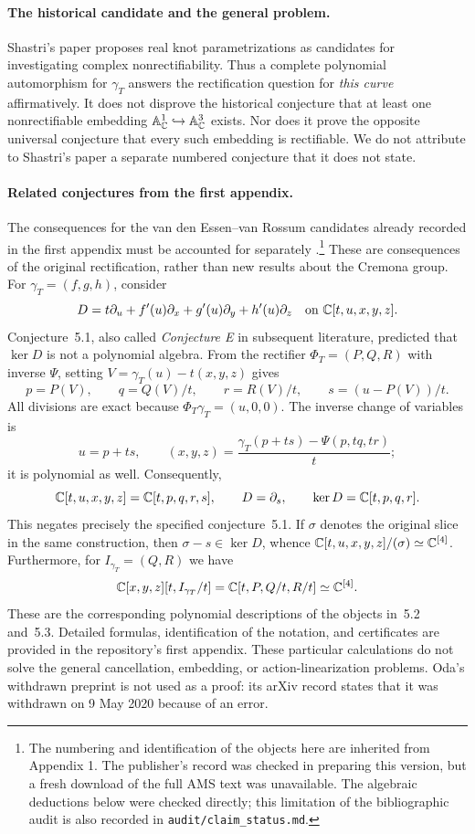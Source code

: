 \paragraph{The historical candidate and the general problem.}
Shastri's paper \cite[\S1 and \S3, Example~1]{Shastri1992} proposes
real knot parametrizations as candidates for investigating complex
nonrectifiability. Thus a complete polynomial automorphism for
$\gamma_T$ answers the rectification question for \emph{this curve}
affirmatively. It does not disprove the historical conjecture that at
least one nonrectifiable embedding
${\mathbb A}^1_{{\mathbb C}}\hookrightarrow{\mathbb A}^3_{{\mathbb C}}$ exists. Nor does it prove the
opposite universal conjecture that every such embedding is rectifiable.
We do not attribute to Shastri's paper a separate numbered conjecture
that it does not state.

\paragraph{Related conjectures from the first appendix.}
The consequences for the van den Essen--van Rossum candidates already
recorded in the first appendix must be accounted for separately
\cite[\S5, Conjectures~5.1--5.3]{VdER2002}.\footnote{The numbering and
identification of the objects here are inherited from Appendix 1.
The publisher's record was checked in preparing this version, but a
fresh download of the full AMS text was unavailable. The algebraic
deductions below were checked directly; this limitation of the
bibliographic audit is also recorded in
\texttt{audit/claim\_status.md}.}
These are consequences of the original rectification, rather than
new results about the Cremona group. For $\gamma_T=(f,g,h)$, consider
\[
 D=t\partial_u+f'(u)\partial_x+g'(u)\partial_y+h'(u)\partial_z
 \quad\text{on }{\mathbb C}[t,u,x,y,z].
\]
Conjecture~5.1, also called \emph{Conjecture E} in subsequent
literature, predicted that $\ker D$ is not a polynomial algebra.
From the rectifier $\Phi_T=(P,Q,R)$ with inverse $\Psi$, setting
$V=\gamma_T(u)-t(x,y,z)$ gives
\[
 p=P(V),\qquad q=Q(V)/t,\qquad r=R(V)/t,\qquad
 s=(u-P(V))/t.
\]
All divisions are exact because $\Phi_T\gamma_T=(u,0,0)$.
The inverse change of variables is
\[
 u=p+ts,\qquad
 (x,y,z)=\frac{\gamma_T(p+ts)-\Psi(p,tq,tr)}{t};
\]
it is polynomial as well. Consequently,
\[
 {\mathbb C}[t,u,x,y,z]={\mathbb C}[t,p,q,r,s],\qquad
 D=\partial_s,\qquad \ker D={\mathbb C}[t,p,q,r].
\]
This negates precisely the specified conjecture~5.1. If $\sigma$
denotes the original slice in the same construction, then
$\sigma-s\in\ker D$, whence
${\mathbb C}[t,u,x,y,z]/(\sigma)\simeq{\mathbb C}^{[4]}$.
Furthermore, for $I_{\gamma_T}=(Q,R)$ we have
\[
 {\mathbb C}[x,y,z][t,I_{\gamma_T}/t]
 ={\mathbb C}[t,P,Q/t,R/t]\simeq{\mathbb C}^{[4]}.
\]
These are the corresponding polynomial descriptions of the objects
in~5.2 and~5.3. Detailed formulas, identification of the notation,
and certificates are provided in the repository's first appendix.
These particular calculations do not solve the general cancellation,
embedding, or action-linearization problems. Oda's withdrawn preprint
\cite{OdaWithdrawn} is not used as a proof: its arXiv record states
that it was withdrawn on 9 May 2020 because of an error.

